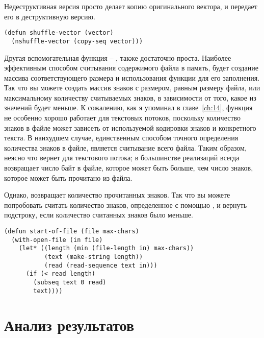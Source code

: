 Недеструктивная версия просто делает копию оригинального вектора, и передает его в
деструктивную версию.

\begin{lstlisting}
(defun shuffle-vector (vector)
  (nshuffle-vector (copy-seq vector)))
\end{lstlisting}

Другая вспомогательная функция -- , также достаточно проста.  Наиболее
эффективным способом считывания содержимого файла в память, будет создание массива
соответствующего размера и использования функции  для его заполнения.
Так что вы можете создать массив знаков с размером, равным размеру файла, или
максимальному количеству считываемых знаков, в зависимости от того, какое из значений
будет меньше.  К сожалению, как я упоминал в главе~\ref{ch:14}, функция 
не особенно хорошо работает для текстовых потоков, поскольку количество знаков в файле
может зависеть от используемой кодировки знаков и конкретного текста.  В наихудшем случае,
единственным способом точного определения количества знаков в файле, является считывание
всего файла.  Таким образом, неясно что вернет  для текстового потока; в
большинстве реализаций  всегда возвращает число байт в файле, которое
может быть больше, чем число знаков, которое может быть прочитано из файла.

Однако,  возвращает количество прочитанных знаков.  Так что вы можете
попробовать считать количество знаков, определенное с помощью , и вернуть
подстроку, если количество считанных знаков было меньше.

\begin{lstlisting}
(defun start-of-file (file max-chars)
  (with-open-file (in file)
    (let* ((length (min (file-length in) max-chars))
           (text (make-string length))
           (read (read-sequence text in)))
      (if (< read length)
        (subseq text 0 read)
        text))))
\end{lstlisting}


\section{Анализ результатов}

